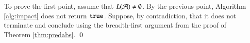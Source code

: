 \documentclass[10pt]{llncs}
\begin{document}
{  To prove the first point, assume that $L(\mathcal{A}) \neq \emptyset$. By the
  previous point, Algorithm \ref{alg:impact} does not return
  $\mathtt{true}$. Suppose, by contradiction, that it does not terminate and
  conclude using the breadth-first argument from the proof of Theorem
  \ref{thm:predabs}. \qed}

\end{document}
